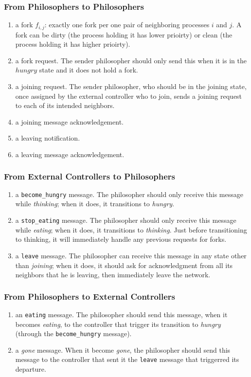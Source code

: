 \documentclass[11pt]{article}
\begin{document}
\subsubsection{From Philosophers to Philosophers}
\begin{enumerate}
\item a fork $f_{i,j}$: exactly one fork per one pair of neighboring processes $i$ and $j$. A fork can be dirty (the process holding it has lower prioirty) or clean (the process holding it has higher prioirty).
\item a fork request. The sender philosopher should only send this when it is in the $hungry$ state and it does not hold a fork.
\item a joining request. The sender philosopher, who should be in the joining state, once assigned by the external controller who to join, sends a joining request to each of its intended neighbors.
\item a joining message acknowledgement.
\item a leaving notification.
\item a leaving message acknowledgement.
\end{enumerate}

\subsubsection{From External Controllers to Philosophers}
\begin{enumerate}
\item a \texttt{become\_hungry} message. The philosopher should only receive this message while \textit{thinking}; when it does, it transitions to \textit{hungry}.
\item a \texttt{stop\_eating} message. The philosopher should only receive this message while \textit{eating}; when it does, it transitions to \textit{thinking}. Just before transitioning to thinking, it will immediately handle any previous requests for forks.
\item a \texttt{leave} message. The philosopher can receive this message in any state other than \textit{joining}; when it does, it should ask for acknowledgment from all its neighbors that he is leaving, then immediately leave the network.
\end{enumerate}

\subsubsection{From Philosophers to External Controllers}
\begin{enumerate}
\item an \texttt{eating} message. The philosopher should send this message, when it becomes \textit{eating}, to the controller that trigger its transition to \textit{hungry} (through the \texttt{become\_hungry} message).
\item a \textit{gone} message. When it become \textit{gone}, the philosopher should send this message to the controller that sent it the \texttt{leave} message that triggerred its departure.
\end{enumerate}
\end{document}
